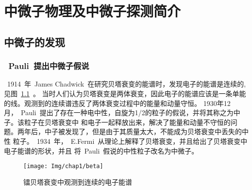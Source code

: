 
\chapter{中微子物理及中微子探测简介}
\label{chap:chap2}
\section{中微子的发现}
\subsection{~Pauli~提出中微子假说}
~1914~年~James Chadwick~在研究贝塔衰变的能谱时\citep{chadwick1914intensitatsverteilung}，发现电子的能谱是连续的,见图~\ref{fig:beta}~。
 当时人们认为贝塔衰变是两体衰变，因此电子的能谱应该是一条单能的线。观测到的连续谱违反了两体衰变过程中的能量和动量守恒。
 1930年12月，~Pauli~提出了存在一种电中性，自旋为1/2的粒子的假说\citep{pauli2letter}，并将其称之为中子。该粒子在贝塔衰变中
 和电子一起释放出来，解决了能量和动量不守恒的问题。两年后，中子被发现了，但是由于其质量太大，不能成为贝塔衰变中丢失的中性
 粒子。~1934~年，~E.Fermi~从理论上解释了贝塔衰变\citep{fermi1934versuch}，并且给出了贝塔衰变中电子能谱的形状，并且
 将~Pauli~假说的中性粒子改名为中微子。
\begin{figure}[!htbp]
  \centering
   \texttt{[image: Img/chap1/beta]}
    \caption{镭贝塔衰变中观测到连续的电子能谱}
  \label{fig:beta}
\end{figure}
